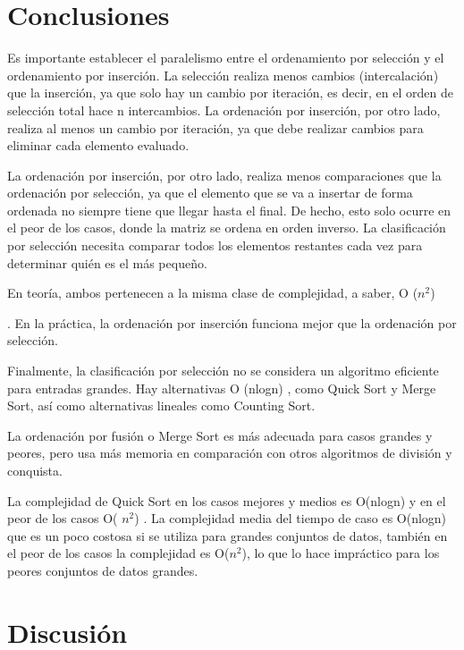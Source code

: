 \documentclass[a4paper]{article}
\begin{document}
\section{Conclusiones}


Es importante establecer el paralelismo entre el ordenamiento por selección y el ordenamiento por inserción. La selección realiza menos cambios (intercalación) que la inserción, ya que solo hay un cambio por iteración, es decir, en el orden de selección total hace n
intercambios. La ordenación por inserción, por otro lado, realiza al menos un cambio por iteración, ya que debe realizar cambios para eliminar cada elemento evaluado.

La ordenación por inserción, por otro lado, realiza menos comparaciones que la ordenación por selección, ya que el elemento que se va a insertar de forma ordenada no siempre tiene que llegar hasta el final. De hecho, esto solo ocurre en el peor de los casos, donde la matriz se ordena en orden inverso. La clasificación por selección necesita comparar todos los elementos restantes cada vez para determinar quién es el más pequeño.

En teoría, ambos pertenecen a la misma clase de complejidad, a saber, O ($n^{2}$)

. En la práctica, la ordenación por inserción funciona mejor que la ordenación por selección.

Finalmente, la clasificación por selección no se considera un algoritmo eficiente para entradas grandes. Hay alternativas O (nlogn)
, como Quick Sort y Merge Sort, así como alternativas lineales como Counting Sort. 


La ordenación por fusión o Merge Sort es más adecuada para casos grandes y peores, pero usa más memoria en comparación con otros algoritmos de división y conquista.

\cite{rin}

La complejidad de Quick Sort en los casos mejores y medios  es O(nlogn) y en el peor de los casos O( $n^{2}$)  . La complejidad media del tiempo de caso es O(nlogn) que es un poco costosa si se utiliza para grandes conjuntos de datos, también en el peor de los casos la complejidad es O($n^{2}$), lo que lo hace impráctico para los peores conjuntos de datos grandes.

\section{Discusión}






\end{document}

